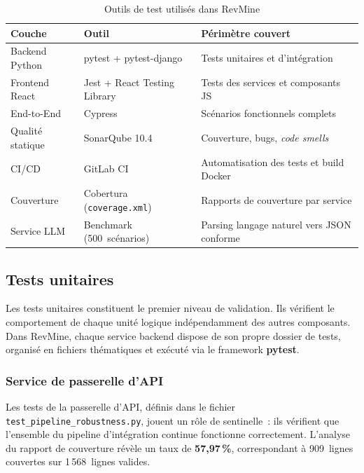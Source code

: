 \begin{table}[H]
\centering
\small
\caption{Outils de test utilisés dans RevMine}
\label{tab:outils-tests}
\begin{tabular}{|>{\raggedright\arraybackslash}p{3.5cm}
                |>{\raggedright\arraybackslash}p{3.8cm}
                |>{\raggedright\arraybackslash}p{5.5cm}|}
\hline
\textbf{Couche} & \textbf{Outil} & \textbf{Périmètre couvert} \\
\hline
Backend Python & pytest + pytest-django & Tests unitaires et d'intégration \\
\hline
Frontend React & Jest + React Testing Library & Tests des services et composants JS \\
\hline
End-to-End & Cypress & Scénarios fonctionnels complets \\
\hline
Qualité statique & SonarQube 10.4 & Couverture, bugs, \textit{code smells} \\
\hline
CI/CD & GitLab CI & Automatisation des tests et build Docker \\
\hline
Couverture & Cobertura (\texttt{coverage.xml}) & Rapports de couverture par service \\
\hline
Service LLM & Benchmark (500~scénarios) & Parsing langage naturel vers JSON conforme \\
\hline
\end{tabular}
\end{table}

\subsection{Tests unitaires}

Les tests unitaires constituent le premier niveau de validation. Ils vérifient le comportement
de chaque unité logique indépendamment des autres composants. Dans RevMine, chaque service
backend dispose de son propre dossier de tests, organisé en fichiers thématiques et exécuté via
le framework \textbf{pytest}.

\subsubsection*{Service de passerelle d'API}

Les tests de la passerelle d'API, définis dans le fichier \texttt{test\_pipeline\_robustness.py},
jouent un rôle de sentinelle~: ils vérifient que l'ensemble du pipeline d'intégration continue
fonctionne correctement. L'analyse du rapport de couverture révèle un taux de
\textbf{57,97\,\%}, correspondant à 909~lignes couvertes sur 1\,568~lignes valides.

